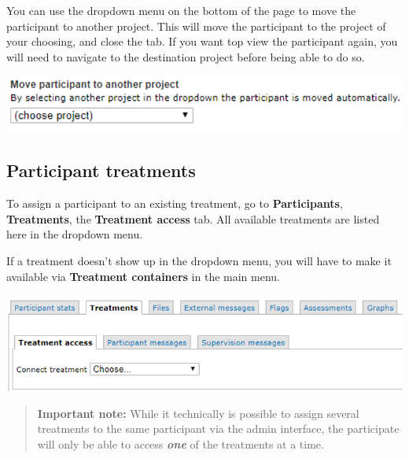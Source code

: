 \documentclass[
]{book}
\begin{document}
You can use the dropdown menu on the bottom of the page to move the participant to another project. This will move the participant to the project of your choosing, and close the tab. If you want top view the participant again, you will need to navigate to the destination project before being able to do so.

\includegraphics{images/new-images/participantMoveProject.png}

\subsection{Participant treatments}\label{participant-treatments}

To assign a participant to an existing treatment, go to \textbf{Participants}, \textbf{Treatments}, the \textbf{Treatment access} tab. All available treatments are listed here in the dropdown menu.

If a treatment doesn't show up in the dropdown menu, you will have to make it available via \textbf{Treatment containers} in the main menu.

\includegraphics{images/new-images/participantTreatConnect.png}

\begin{quote}
\textbf{Important note:} While it technically is possible to assign several treatments to the same participant via the admin interface, the participate will only be able to access \emph{\textbf{one}} of the treatments at a time.
\end{quote}
\end{document}
